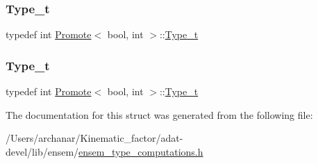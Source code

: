 \subsubsection{\texorpdfstring{Type\_t}{Type\_t}\hspace{0.1cm}{\footnotesize\ttfamily [2/3]}}
{\footnotesize\ttfamily typedef int \mbox{\hyperlink{structPromote}{Promote}}$<$ bool, int $>$\+::\mbox{\hyperlink{structPromote_3_01bool_00_01int_01_4_a7b27a2556c64a5b0f00d0a2fbac26b8a}{Type\+\_\+t}}}

\mbox{\label{structPromote_3_01bool_00_01int_01_4_a7b27a2556c64a5b0f00d0a2fbac26b8a}} 
\subsubsection{\texorpdfstring{Type\_t}{Type\_t}\hspace{0.1cm}{\footnotesize\ttfamily [3/3]}}
{\footnotesize\ttfamily typedef int \mbox{\hyperlink{structPromote}{Promote}}$<$ bool, int $>$\+::\mbox{\hyperlink{structPromote_3_01bool_00_01int_01_4_a7b27a2556c64a5b0f00d0a2fbac26b8a}{Type\+\_\+t}}}



The documentation for this struct was generated from the following file\+:\begin{DoxyCompactItemize}
\item 
/\+Users/archanar/\+Kinematic\+\_\+factor/adat-\/devel/lib/ensem/\mbox{\hyperlink{adat-devel_2lib_2ensem_2ensem__type__computations_8h}{ensem\+\_\+type\+\_\+computations.\+h}}\end{DoxyCompactItemize}

